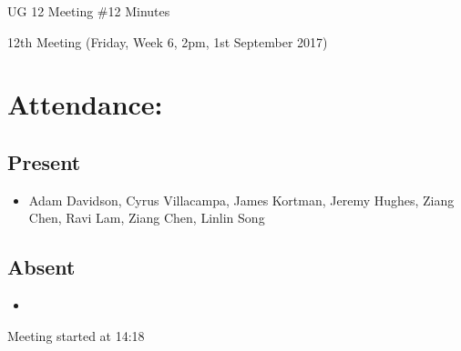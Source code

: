 \documentclass{article}
\begin{document}
\begin{adjustwidth}{2.5em}{0pt}
\begin{center}
\Large{UG 12 Meeting \#12 Minutes}\\
\end{center}
\end{adjustwidth}


12th Meeting (Friday, Week 6, 2pm, 1st September 2017)
\section{Attendance:}
\subsection*{Present}
\begin{itemize}
\item Adam Davidson, Cyrus Villacampa, James Kortman, Jeremy Hughes, Ziang Chen, Ravi Lam, Ziang Chen, Linlin Song
\end{itemize}
\subsection*{Absent}
\begin{itemize}
\item 
\end {itemize}

Meeting started at 14:18
\end{document}
